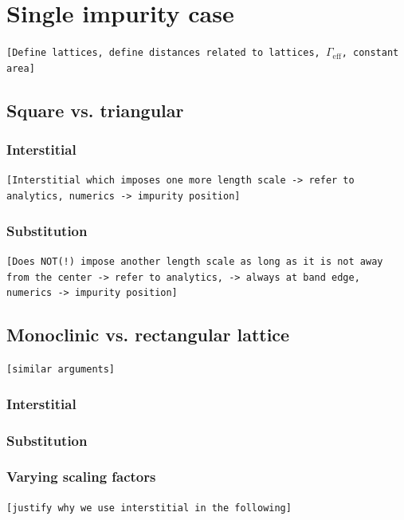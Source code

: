 \documentclass[aps,pra,superscriptaddress,twocolumn]{revtex4-1}
\newcommand{\commentSO}[1]{\texttt{\color{orange}[#1]}}
\begin{document}
\section{Single impurity case}
\commentSO{Define lattices, define distances related to lattices, $\Gamma_\mathrm{eff}$, constant area}

\subsection{Square vs. triangular}

\subsubsection{Interstitial}
\commentSO{Interstitial which imposes one more length scale -> refer to analytics, numerics -> impurity position}


\subsubsection{Substitution}
\commentSO{Does NOT(!) impose another length scale as long as it is not away from the center -> refer to analytics, -> always at band edge, numerics -> impurity position}

\subsection{Monoclinic vs. rectangular lattice}
\commentSO{similar arguments}

\subsubsection{Interstitial}


\subsubsection{Substitution}

\subsubsection{Varying scaling factors}
\commentSO{justify why we use interstitial in the following}
\end{document}
